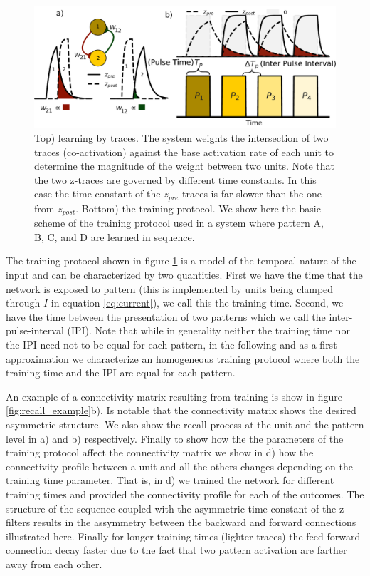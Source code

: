 \documentclass[10pt,a4paper]{article}
\begin{document}
\begin{figure}[H]
\centering
\includegraphics[scale=0.30]{protocol.pdf}
\caption{Top) learning by traces. The system weights the intersection of two traces (co-activation) against the base activation rate of each unit to determine the magnitude of the weight between two units. Note that the two z-traces are governed by different time constants. In this case the time constant of the $z_{pre}$ traces is far slower than the one from $z_{post}$. Bottom) the training protocol. We show here the basic scheme of the training protocol used in a system where pattern A, B, C, and D are learned in sequence.}
\label{fig:training_protocol}
\end{figure}

The training protocol shown in figure \ref{fig:training_protocol} is a model of the temporal nature of the input and can be characterized by two quantities. First we have the time that the network is exposed to pattern (this is implemented by units being clamped through $I$ in equation \ref{eq:current}), we call this the training time. Second, we have the time between the presentation of two patterns which we call the inter-pulse-interval (IPI). Note that while in generality neither the training time nor the IPI need not to be equal for each pattern, in the following and as a first approximation we characterize an homogeneous training protocol where both the training time and the IPI are equal for each pattern.

An example of a connectivity matrix resulting from training is show in figure \ref{fig:recall_example}b). Is notable that the connectivity matrix shows the desired asymmetric structure. We also show the recall process at the unit and the pattern level in a) and b) respectively. Finally to show how the the parameters of the training protocol affect the connectivity matrix we show in d) how the connectivity profile between a unit and all the others changes depending on the training time parameter. That is, in d) we trained the network for different training times and provided the connectivity profile for each of the outcomes. The structure of the sequence coupled with the asymmetric time constant of the z-filters results in the assymmetry between the backward and forward connections illustrated here. Finally for longer training times (lighter traces) the feed-forward connection decay faster due to the fact that two pattern activation are farther away from each other.
\end{document}
